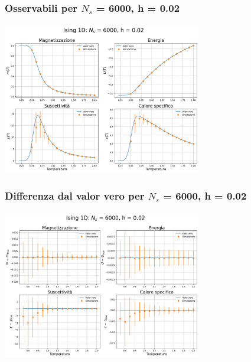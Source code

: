 \begin{frame}
    \frametitle{Osservabili per $N_s$ = 6000, h = 0.02}
    \framesubtitle{}

    \centering
    \includegraphics[width=0.65\textwidth]{Immagini/backupIsing1D/obs_6000_0.02.png}

\end{frame}



\begin{frame}
    \frametitle{Differenza dal valor vero per $N_s$ = 6000, h = 0.02}
    \framesubtitle{}

    \centering
    \includegraphics[width=0.65\textwidth]{Immagini/backupIsing1D/obs_6000_0.02_diff.png}

\end{frame}



